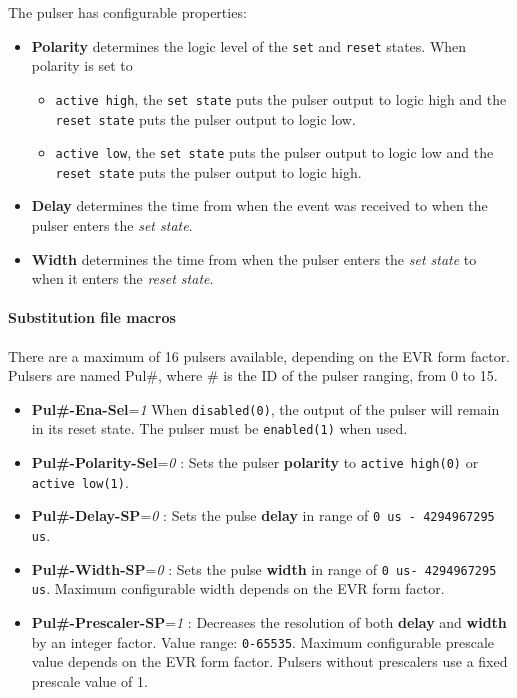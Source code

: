 \documentclass[12pt,a4paper]{article}
\begin{document}
The pulser has configurable properties:
\begin{itemize}
	\item \textbf{Polarity} determines the logic level of the \texttt{set} and \texttt{reset} states. When polarity is set to
	\begin{itemize}
		\item \texttt{active high}, the \texttt{set state} puts the pulser output to logic high and the \texttt{reset state} puts the pulser output to logic low. 
		\item \texttt{active low}, the \texttt{set state} puts the pulser output to logic low and the \texttt{reset state} puts the pulser output to logic high.
	\end{itemize}
	\item  \textbf{Delay} determines the time from when the event was received to when the pulser enters the \textit{set state}.
	\item  \textbf{Width} determines the time from when the pulser enters the \textit{set state} to when it enters the \textit{reset state}.
\end{itemize}

\paragraph{Substitution file macros}
There are a maximum of 16 pulsers available, depending on the EVR form factor. Pulsers are named Pul\#, where \# is the ID of the pulser ranging, from 0 to 15.
\begin{itemize}
  \item
    \textbf{Pul\#-Ena-Sel}=\emph{1} When \texttt{disabled(0)}, the output
    of the pulser will remain in its reset state. The pulser must be
    \texttt{enabled(1)} when used.
  \item
    \textbf{Pul\#-Polarity-Sel}=\emph{0} : Sets the pulser \textbf{polarity} to \texttt{active high(0)} or \texttt{active low(1)}.
  \item
    \textbf{Pul\#-Delay-SP}=\emph{0} : Sets the pulse \textbf{delay} in range of \texttt{0 us - 4294967295 us}.
  \item
    \textbf{Pul\#-Width-SP}=\emph{0} : Sets the pulse \textbf{width} in range of \texttt{0 us- 4294967295 us}. Maximum configurable width depends on the EVR form factor.
  \item
    \textbf{Pul\#-Prescaler-SP}=\emph{1} : Decreases the resolution of both \textbf{delay} and \textbf{width} by an integer factor. Value range: \texttt{0-65535}. Maximum configurable prescale value depends on the EVR form factor. Pulsers without prescalers use a fixed prescale value of 1.
  \end{itemize}
\end{document}
